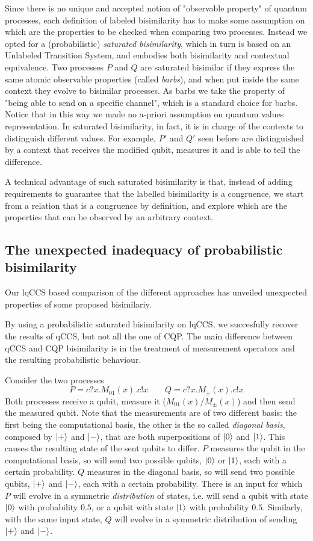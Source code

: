 Since there  is no unique and accepted notion of "observable property" of quantum processes, each definition of labeled bisimilarity has to make some assumption on which are the properties to be checked when comparing two processes. Instead we opted for a (probabilistic) \textit{saturated bisimilarity}, which in turn is based on an Unlabeled Transition System, and embodies both bisimilarity and contextual equivalence. Two processes $P$ and $Q$ are saturated bisimilar if they express the same atomic observable properties (called \textit{barbs}), and when put inside the same context they evolve to bisimilar processes. As barbs we take the property of "being able to send on a specific channel", which  is a standard choice for barbs. Notice that in this way we made no a-priori assumption on quantum values representation. In saturated bisimilarity, in fact, it is in charge of the contexts to distinguish different values. For example, $P'$ and $Q'$ seen before are distinguished by a context that receives the modified qubit, measures it and is able to tell the difference.

A technical advantage of such saturated bisimilarity is that, instead of adding requirements to guarantee that the labelled bisimilarity is a congruence, we start from a relation that is a congruence by definition, and explore which are the properties that can be observed by an arbitrary context.


\subsection*{The unexpected inadequacy of probabilistic bisimilarity}

Our lqCCS based comparison of the different approaches has unveiled unexpected properties of some proposed bisimilariy.

By using a probabilistic saturated bisimilarity on lqCCS, we succesfully recover the results of qCCS, but not all the one of CQP. The main difference between qCCS and CQP bisimilarity is in the treatment of measurement operators and the resulting probabilistic behaviour.

Consider the two processes 
\[P = c?x.M_{01}(x).c!x \qquad Q = c?x.M_\pm(x).c!x\]
Both processes receive a qubit, measure it ($M_{01}(x) / M_{\pm}(x)$) and then send the measured qubit. Note that the measurements are of two different basis: the first being the computational basis, the other is the so called \textit{diagonal basis}, composed by $\ket{+}$ and $\ket{-}$, that are both superpositions of $\ket{0}$ and $\ket{1}$.  This causes the resulting state of the sent qubits to differ. $P$ measures the qubit in the computational basis, so will send two possible qubits, $\ket{0}$ or $\ket{1}$, each with a certain probability. $Q$ measures in the diagonal basis, so will send two possible qubits, $\ket{+}$ and $\ket{-}$, each with a certain probability. There is an input for which $P$ will evolve in a symmetric \textit{distribution} of states, i.e. will send a qubit with state $\ket{0}$ with probability $0.5$, or a qubit with state $\ket{1}$ with probability $0.5$. Similarly, with the same input state, $Q$ will evolve in a symmetric distribution of sending $\ket{+}$ and $\ket{-}$.

